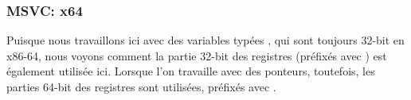 \subsubsection{MSVC: x64}


Puisque nous travaillons ici avec des variables typées \Tint{}, qui sont toujours
32-bit en x86-64, nous voyons comment la partie 32-bit des registres (préfixés
avec ) est également utilisée ici. %
Lorsque l'on travaille avec des ponteurs, toutefois, les parties 64-bit des registres
sont utilisées, préfixés avec .



